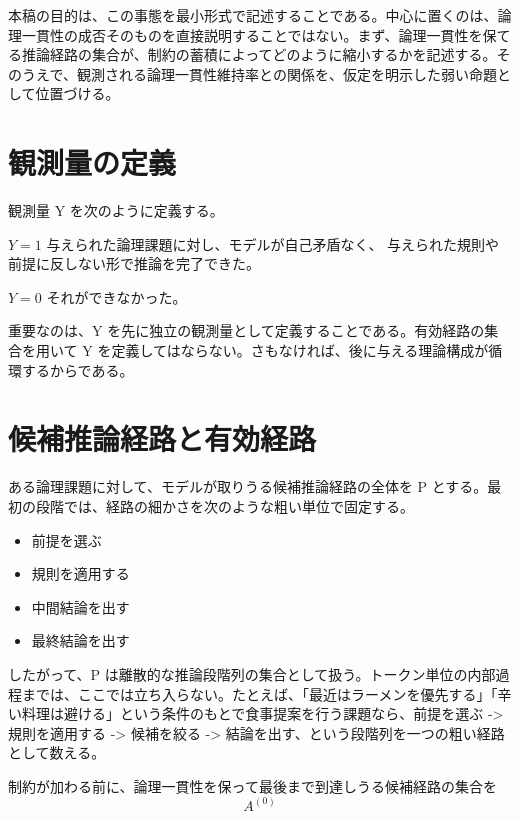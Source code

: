 \documentclass[12pt,a4paper]{article}
\begin{document}
本稿の目的は、この事態を最小形式で記述することである。中心に置くのは、論理一貫性の成否そのものを直接説明することではない。まず、論理一貫性を保てる推論経路の集合が、制約の蓄積によってどのように縮小するかを記述する。そのうえで、観測される論理一貫性維持率との関係を、仮定を明示した弱い命題として位置づける。

\section{観測量の定義}\label{ux89b3ux6e2cux91cfux306eux5b9aux7fa9}

観測量 Y を次のように定義する。

\begin{definition}[観測量 Y]
$Y = 1$
与えられた論理課題に対し、モデルが自己矛盾なく、
与えられた規則や前提に反しない形で推論を完了できた。

$Y = 0$
それができなかった。

\end{definition}

重要なのは、Y を先に独立の観測量として定義することである。有効経路の集合を用いて Y を定義してはならない。さもなければ、後に与える理論構成が循環するからである。

\section{候補推論経路と有効経路}\label{ux5019ux88dcux63a8ux8ad6ux7d4cux8defux3068ux6709ux52b9ux7d4cux8def}

ある論理課題に対して、モデルが取りうる候補推論経路の全体を P とする。最初の段階では、経路の細かさを次のような粗い単位で固定する。

\begin{itemize}
\tightlist
\item
  前提を選ぶ
\item
  規則を適用する
\item
  中間結論を出す
\item
  最終結論を出す
\end{itemize}

したがって、P は離散的な推論段階列の集合として扱う。トークン単位の内部過程までは、ここでは立ち入らない。たとえば、「最近はラーメンを優先する」「辛い料理は避ける」という条件のもとで食事提案を行う課題なら、前提を選ぶ -\textgreater{} 規則を適用する -\textgreater{} 候補を絞る -\textgreater{} 結論を出す、という段階列を一つの粗い経路として数える。

制約が加わる前に、論理一貫性を保って最後まで到達しうる候補経路の集合を \[
A^{(0)}
\]
\end{document}
